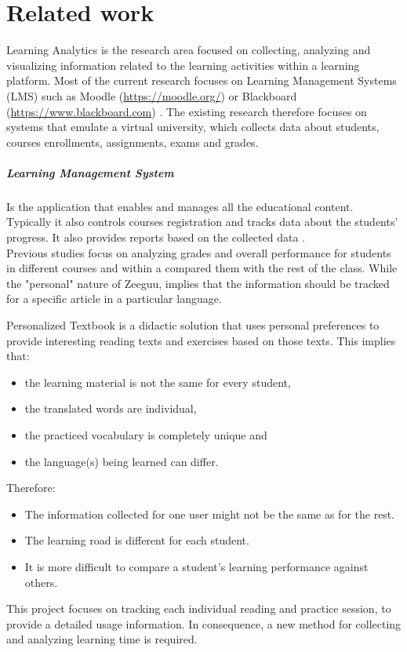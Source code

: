 \chapter{Related work}\label{ch:learning analytics}

Learning Analytics is the research area focused on collecting, analyzing and visualizing information \cite{Brown2011} related to the learning activities within a learning platform. Most of the current research focuses on Learning Management Systems (LMS) such as Moodle (\url{https://moodle.org/}) \cite{Park2015} \cite{Romero2008} or Blackboard (\url{https://www.blackboard.com}) \cite{Arnold2012}. The existing research therefore focuses on systems that emulate a virtual university, which collects data about students, courses enrollments, assignments, exams and grades.

\paragraph{Learning Management System}

Is the application that enables and manages all the educational content. Typically it also controls courses registration and tracks data about the students' progress. It also provides reports based on the collected data \cite{Watson2007}.\\

Previous studies focus on analyzing grades and overall performance for students in different courses and within a compared them with the rest of the class. While the "personal" nature of Zeeguu, implies that the information should be tracked for a specific article in a particular language. 

Personalized Textbook \cite{Mircea2018} is a didactic solution that uses personal preferences to provide interesting reading texts and exercises based on those texts. This implies that:
\begin{itemize}
	\item the learning material is not the same for every student,
	\item the translated words are individual,
	\item the practiced vocabulary is completely unique and
	\item the language(s) being learned can differ.
\end{itemize}

Therefore:
\begin{itemize}
	\item The information collected for one user might not be the same as for the rest.
	\item The learning road is different for each student.
	\item It is more difficult to compare a student's learning performance against others. 
\end{itemize}

This project focuses on tracking each individual reading and practice session, to provide a detailed usage information. In consequence, a new method for collecting and analyzing learning time is required.


